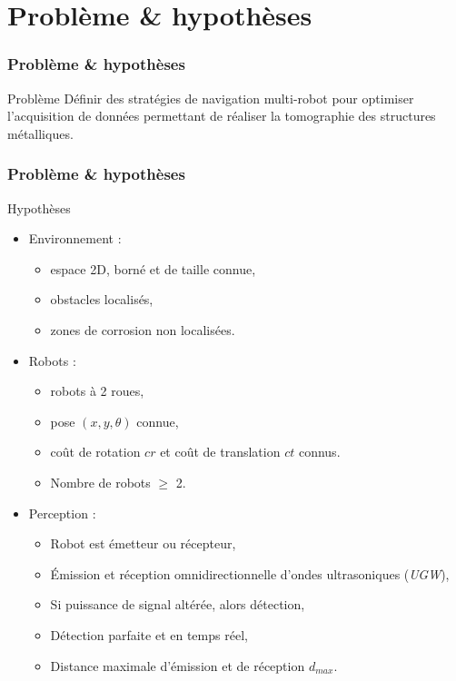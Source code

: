 \documentclass{beamer}
\begin{document}
	\section{Problème \& hypothèses}
		\begin{frame}
			\frametitle{Problème \& hypothèses}
			\begin{block}{Problème}
				Définir des stratégies de navigation multi-robot pour optimiser l'acquisition de données permettant de réaliser la tomographie des structures métalliques.
			\end{block}
		\end{frame}
		\begin{frame}
			\frametitle{Problème \& hypothèses}
			\begin{block}{Hypothèses}
				\begin{itemize}
					\item Environnement :
					\begin{itemize}
						\item espace 2D, borné et de taille connue,
						\item obstacles localisés,
						\item zones de corrosion non localisées.
					\end{itemize}
					\item Robots :
					\begin{itemize}
						\item robots à 2 roues,
						\item pose $(x, y, \theta)$ connue,
						\item coût de rotation $cr$ et coût de translation $ct$ connus.
						\item Nombre de robots $\ge$ 2.
					\end{itemize}
					\item Perception :
					\begin{itemize}
						\item Robot est émetteur ou récepteur,
						\item Émission et réception omnidirectionnelle d'ondes ultrasoniques (\textit{UGW}),
						\item Si puissance de signal altérée, alors détection,
						\item Détection parfaite et en temps réel,
						\item Distance maximale d'émission et de réception $d_{max}$.
					\end{itemize}
				\end{itemize}
			\end{block}
		\end{frame}
\end{document}
